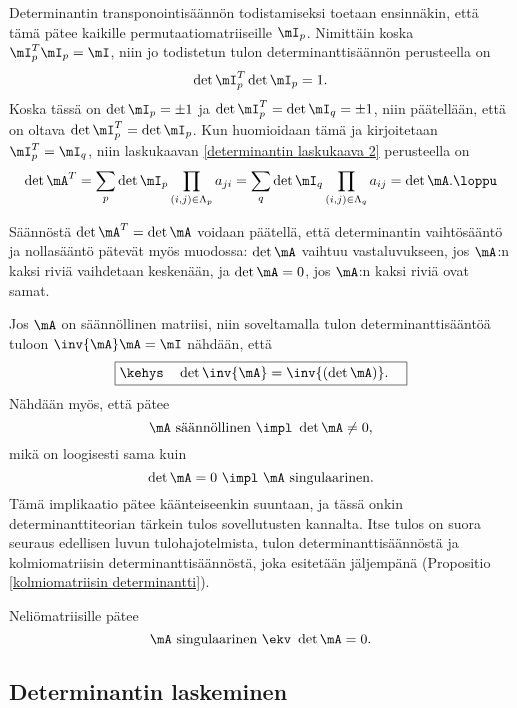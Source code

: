 Determinantin transponointisäännön todistamiseksi toetaan ensinnäkin, että tämä pätee kaikille
permutaatiomatriiseille $\mI_p$. Nimittäin koska $\mI_p^T\mI_p=\mI$, niin jo todistetun tulon
determinanttisäännön perusteella on
\[
\det\mI_p^T\det\mI_p = 1.
\]
Koska tässä on $\det\mI_p=\pm 1$ ja $\det\mI_p^T=\det\mI_q=\pm 1$, niin päätellään, että on
oltava $\det\mI_p^T=\det\mI_p$. Kun huomioidaan tämä ja kirjoitetaan $\mI_p^T=\mI_q$, niin
laskukaavan \eqref{determinantin laskukaava 2} perusteella on
\[
\det\mA^T = \sum_p \det\mI_p \prod_{(i,j)\in\Lambda_p} a_{ji}
          = \sum_q \det\mI_q \prod_{(i,j)\in\Lambda_q} a_{ij} = \det\mA. \loppu
\]

Säännöstä $\det\mA^T=\det\mA$ voidaan päätellä, että determinantin vaihtösääntö ja nollasääntö
pätevät myös muodossa: $\det\mA$ vaihtuu vastaluvukseen, jos $\mA$:n kaksi riviä vaihdetaan 
keskenään, ja $\det\mA=0$, jos $\mA$:n kaksi riviä ovat samat.
  
Jos $\mA$ on säännöllinen matriisi, niin soveltamalla tulon determinanttisääntöä tuloon 
$\inv{\mA}\mA=\mI$ nähdään, että
\[
\boxed{\kehys\quad \det\inv{\mA}=\inv{(\det\mA)}. \quad}
\]
Nähdään myös, että pätee
\[
\mA \text{ säännöllinen } \impl \ \det\mA \neq 0,
\]
mikä on loogisesti sama kuin
\[
\det\mA=0 \ \impl \ \mA \text{ singulaarinen.}
\]
Tämä implikaatio pätee käänteiseenkin suuntaan, ja tässä onkin determinanttiteorian tärkein 
tulos sovellutusten kannalta. Itse tulos on suora seuraus edellisen luvun tulohajotelmista, 
tulon determinanttisäännöstä ja kolmiomatriisin determinanttisäännöstä, joka esitetään 
jäljempänä (Propositio \ref{kolmiomatriisin determinantti}).
\begin{Lause} \label{determinanttilause} 
 Neliömatriisille pätee
\[
\mA \text{ singulaarinen } \ekv \ \det\mA=0.
\]
\end{Lause}

\subsection{Determinantin laskeminen}

